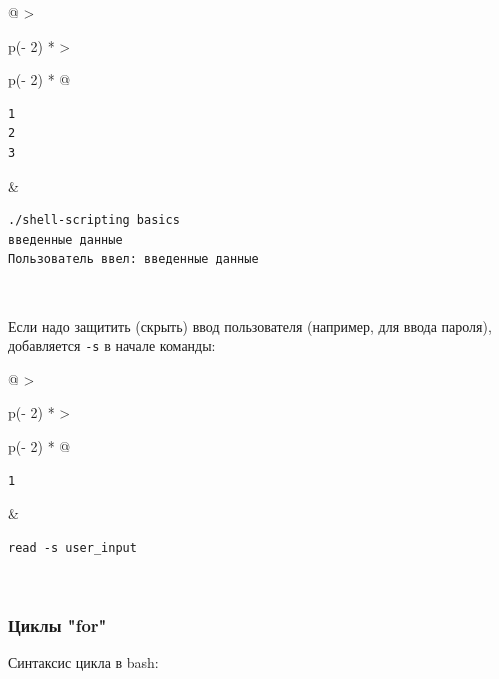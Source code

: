 \documentclass{article}
\begin{document}
\begin{longtable}[]{@{}
  >{\raggedright\arraybackslash}p{(\columnwidth - 2\tabcolsep) * }
  >{\raggedright\arraybackslash}p{(\columnwidth - 2\tabcolsep) * }@{}}
\toprule
\endhead
\begin{minipage}[t]{\linewidth}\raggedright
\begin{verbatim}
1
2
3
\end{verbatim}
\end{minipage} & \begin{minipage}[t]{\linewidth}\raggedright
\begin{verbatim}
./shell-scripting basics
введенные данные
Пользователь ввел: введенные данные
\end{verbatim}
\end{minipage} \\ \addlinespace
\bottomrule
\end{longtable}

Если надо защитить (скрыть) ввод пользователя (например, для ввода
пароля), добавляется \texttt{-s} в начале команды:

\begin{longtable}[]{@{}
  >{\raggedright\arraybackslash}p{(\columnwidth - 2\tabcolsep) * }
  >{\raggedright\arraybackslash}p{(\columnwidth - 2\tabcolsep) * }@{}}
\toprule
\endhead
\begin{minipage}[t]{\linewidth}\raggedright
\begin{verbatim}
1
\end{verbatim}
\end{minipage} & \begin{minipage}[t]{\linewidth}\raggedright
\begin{verbatim}
read -s user_input
\end{verbatim}
\end{minipage} \\ \addlinespace
\bottomrule
\end{longtable}

\hypertarget{for-loops}{%
\subsubsection{\texorpdfstring{\protect\hyperlink{for-loops}{}Циклы
"for"}{Циклы "for"}}\label{for-loops}}

Синтаксис цикла в bash:
\end{document}
